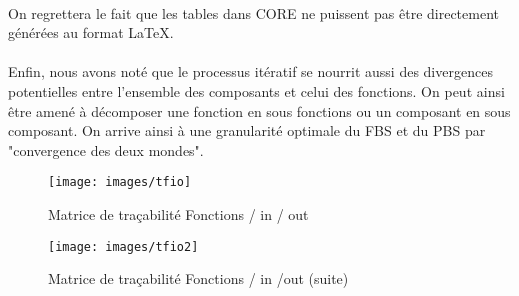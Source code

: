 \paragraph{}
On regrettera le fait que les tables dans CORE ne puissent pas être directement générées au format \LaTeX.

\paragraph{}
Enfin, nous avons noté que le processus itératif se nourrit aussi des divergences potentielles entre l'ensemble des composants et celui des fonctions. On peut ainsi être amené à décomposer une fonction en sous fonctions ou un composant en sous composant. On arrive ainsi à une granularité optimale du FBS et du PBS  par "convergence des deux mondes".  

\begin{landscape}

\begin{figure}[H]
	\begin{center}	
		\texttt{[image: images/tfio]}
		
		\caption{Matrice de traçabilité Fonctions / in / out }
		\label{tfio}
	\end{center}
\end{figure}
	



	\begin{figure}[H]
		\begin{center}	
			\texttt{[image: images/tfio2]}
			\caption{Matrice de traçabilité Fonctions / in /out  (suite)}
			\label{tfio2}
		\end{center}
	\end{figure}
	
\end{landscape}
